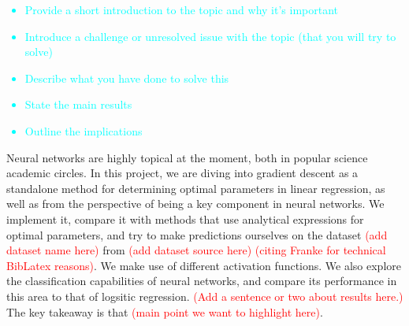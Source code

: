 \begin{adjustwidth}{2cm}{2cm} %
        \textcolor{cyan}{
        \begin{itemize}
            \item Provide a short introduction to the topic and why it's important
            \item Introduce a challenge or unresolved issue with the topic (that you will try to solve)
            \item Describe what you have done to solve this
            \item State the main results
            \item Outline the implications
        \end{itemize}}

        Neural networks are highly topical at the moment, both in popular science academic circles. In this project, we are diving into gradient descent as a standalone method for determining optimal parameters in linear regression, as well as from the perspective of being a key component in neural networks. We implement it, compare it with methods that use analytical expressions for optimal parameters, and try to make predictions ourselves on the dataset \textcolor{red}{(add dataset name here)} from \textcolor{red}{(add dataset source here)} \cite{franke} \textcolor{red}{(citing Franke for technical BibLatex reasons)}. We make use of different activation functions. We also explore the classification capabilities of neural networks, and compare its performance in this area to that of logsitic regression. \textcolor{red}{(Add a sentence or two about results here.)} The key takeaway is that \textcolor{red}{(main point we want to highlight here)}.
      \end{adjustwidth}

